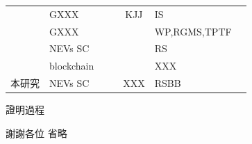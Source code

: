 \documentclass[
    writingLanguage=chinese, %
    addPageTitle=on,  %
    addDeclaration=on, %
    addMUSTlog=off, %
    addFigTOC=on, %
    addTabTOC=on, %
    refIndent=off, %
    printMod=off, %
]{must}
\begin{document}
\begin{table}
\begin{tabular}{p{7cm}m{3cm}cccll}
            \citeauthor{rae1905}             
                & GXXX             &  \icon{\Checkmark}              &  \icon{\Checkmark}         &KJJ              & IS             
                &\citeyear{rae1905}\\
                
            \citeauthor{rae1905}              
                & GXXX             & \icon{\Checkmark}           & \icon{\XSolidBrush}             & \icon{\XSolidBrush}             & WP,RGMS,TPTF             
                &\citeyear{Brown2013}\\
                
            \citeauthor{rae1905}
                & NEVs SC             & \icon{\Checkmark}              & \icon{\XSolidBrush}             & \icon{\XSolidBrush}             & RS                        
                &\citeyear{Hossain2013}\\

\citeauthor{rae1905} & blockchain  & \icon{\XSolidBrush}   & \icon{\XSolidBrush}   & \icon{\XSolidBrush}   & XXX& \citeyear{rae1905}  \\ 
本研究      & NEVs SC     & \icon{\Checkmark}   & \icon{\Checkmark}       & XXX   & RSBB\\

        \bottomrule
    \end{tabular}
\end{table}







\begin{appendix}
證明過程
\end{appendix}


\begin{acknowpage}
謝謝各位 
省略
\end{acknowpage}



\begin{addcvpage}




\end{addcvpage}
\end{document}
